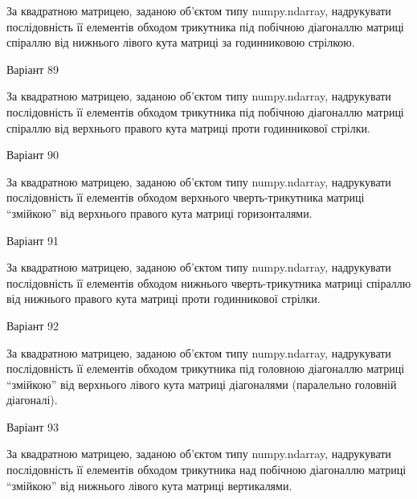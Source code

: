 \documentclass[11pt, ukrainian]{article}
\begin{document}
За квадратною матрицею, заданою об'єктом типу numpy.ndarray, надрукувати послідовність її елементів обходом трикутника під побічною діагоналлю матриці спіраллю від нижнього лівого кута матриці за годинниковою стрілкою.





{\Large \center  Варіант  89\par \bigskip\bigskip}

За квадратною матрицею, заданою об'єктом типу numpy.ndarray, надрукувати послідовність її елементів обходом трикутника під побічною діагоналлю матриці спіраллю від верхнього правого кута матриці проти годинникової стрілки.





{\Large \center  Варіант  90\par \bigskip\bigskip}

За квадратною матрицею, заданою об'єктом типу numpy.ndarray, надрукувати послідовність її елементів обходом верхнього чверть-трикутника матриці ``змійкою'' від верхнього правого кута матриці горизонталями.





{\Large \center  Варіант  91\par \bigskip\bigskip}

За квадратною матрицею, заданою об'єктом типу numpy.ndarray, надрукувати послідовність її елементів обходом нижнього чверть-трикутника матриці спіраллю від нижнього правого кута матриці проти годинникової стрілки.





{\Large \center  Варіант  92\par \bigskip\bigskip}

За квадратною матрицею, заданою об'єктом типу numpy.ndarray, надрукувати послідовність її елементів обходом трикутника під головною діагоналлю матриці ``змійкою'' від верхнього лівого кута матриці діагоналями (паралельно головній діагоналі).




{\Large \center  Варіант  93\par \bigskip\bigskip}

За квадратною матрицею, заданою об'єктом типу numpy.ndarray, надрукувати послідовність її елементів обходом трикутника над побічною діагоналлю матриці ``змійкою'' від нижнього лівого кута матриці вертикалями.
\end{document}
